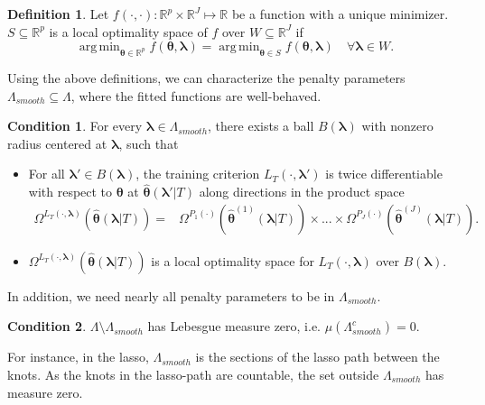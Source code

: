 \documentclass[12pt]{article} %
\theoremstyle{definition}
\newtheorem{definition}{Definition}
\newtheorem{condition}{Condition}
\DeclareMathOperator*{\argmin}{arg\,min}
\begin{document}
\begin{definition}
	Let $f(\cdot, \cdot): \mathbb{R}^p \times \mathbb{R}^J \mapsto \mathbb{R}$ be a function with a unique minimizer.
	$S \subseteq \mathbb{R}^p$ is a local optimality space of $f$ over $W \subseteq \mathbb{R}^J$ if
	\begin{equation}
	\argmin_{\boldsymbol{\theta} \in \mathbb{R}^p} f(\boldsymbol{\theta}, \boldsymbol \lambda) =
	\argmin_{\boldsymbol{\theta} \in S} f(\boldsymbol{\theta}, \boldsymbol \lambda) \quad \forall \boldsymbol \lambda \in W.
	\end{equation}
\end{definition}
\noindent Using the above definitions, we can characterize the penalty parameters $\Lambda_{smooth} \subseteq \Lambda$, where the fitted functions are well-behaved.
\begin{condition}
	\label{condn:nonsmooth1}
	For every $\boldsymbol{\lambda} \in \Lambda_{smooth}$, there exists a ball $B(\boldsymbol{\lambda})$ with nonzero radius centered at $\boldsymbol{\lambda}$, such that
	\begin{itemize}
		\item For all $\boldsymbol{\lambda}'\in B(\boldsymbol{\lambda})$, the training criterion $L_{T}(\cdot, \boldsymbol{\lambda}')$ is twice differentiable with respect to $\boldsymbol{\theta}$ at $\hat{\boldsymbol{\theta}}(\boldsymbol{\lambda}'|T)$
		along directions in the product space
		\begin{align}
		\Omega^{L_T(\cdot, \boldsymbol{\lambda})} \left (\hat{\boldsymbol \theta}\left(\boldsymbol{\lambda}|T \right) \right) =
		& \Omega^{P_1(\cdot)}
			\left(\hat{\boldsymbol{\theta}}^{(1)}(\boldsymbol{\lambda} | T)\right)
		\times
		...
		\times
		\Omega^{P_J(\cdot)}
		\left(\hat{\boldsymbol{\theta}}^{(J)}(\boldsymbol{\lambda} | T)\right)
		.
		\end{align}
		\item $\Omega^{L_T(\cdot, \boldsymbol{\lambda})} \left (\hat{\boldsymbol \theta}\left(\boldsymbol{\lambda}|T \right) \right)$ is a local optimality space for $L_T\left(\cdot,\boldsymbol{\lambda}\right)$ over $B(\boldsymbol{\lambda})$.
	\end{itemize}
\end{condition}
\noindent In addition, we need nearly all penalty parameters to be in $\Lambda_{smooth}$.
\begin{condition}
	\label{condn:nonsmooth2}
	$\Lambda \setminus \Lambda_{smooth}$ has Lebesgue measure zero, i.e. $\mu(\Lambda_{smooth}^c) = 0$.
\end{condition}
\noindent For instance, in the lasso, $\Lambda_{smooth}$ is the sections of the lasso path between the knots.
As the knots in the lasso-path are countable, the set outside $\Lambda_{smooth}$ has measure zero.
\end{document}
